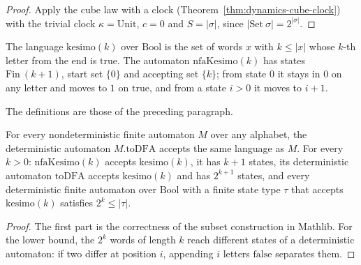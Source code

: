 \begin{proof}
  \leanok
  Apply the cube law with a clock (Theorem~\ref{thm:dynamics-cube-clock}) with the trivial clock
  $\kappa = \mathrm{Unit}$, $c = 0$ and $S = |\sigma|$, since $|\mathrm{Set}\ \sigma| = 2^{|\sigma|}$.
\end{proof}

The language $\mathrm{kesimo}(k)$ over $\mathrm{Bool}$ is the set of words $x$ with $k \le |x|$ whose
$k$-th letter from the end is $\mathrm{true}$. The automaton $\mathrm{nfaKesimo}(k)$ has states
$\mathrm{Fin}\ (k+1)$, start set $\{0\}$ and accepting set $\{k\}$; from state $0$ it stays in $0$
on any letter and moves to $1$ on $\mathrm{true}$, and from a state $i > 0$ it moves to $i + 1$.

\begin{definition}
  \label{def:dynamics-kesimo}
  \leanok
  The definitions are those of the preceding paragraph.
  \own{}
\end{definition}

\begin{theorem}
  \label{thm:dynamics-subsets-collapse}
  \leanok
  For every nondeterministic finite automaton $M$ over any alphabet, the deterministic automaton
  $M.\mathrm{toDFA}$ accepts the same language as $M$. For every $k > 0$: $\mathrm{nfaKesimo}(k)$
  accepts $\mathrm{kesimo}(k)$, it has $k + 1$ states, its deterministic automaton $\mathrm{toDFA}$
  accepts $\mathrm{kesimo}(k)$ and has $2^{k+1}$ states, and every deterministic finite automaton
  over $\mathrm{Bool}$ with a finite state type $\tau$ that accepts $\mathrm{kesimo}(k)$ satisfies
  $2^k \le |\tau|$.
  \own{}
\end{theorem}

\begin{proof}
  \leanok
  The first part is the correctness of the subset construction in Mathlib. For the lower bound, the
  $2^k$ words of length $k$ reach different states of a deterministic automaton: if two differ at
  position $i$, appending $i$ letters $\mathrm{false}$ separates them.
\end{proof}

